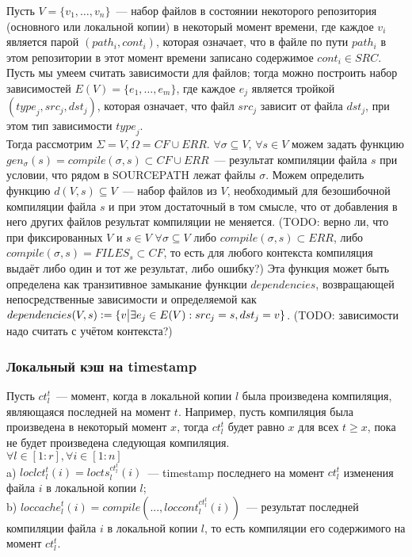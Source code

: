 Пусть $V = \{v_1, \dots, v_n\}$~--- набор файлов в состоянии некоторого репозитория (основного или локальной копии) в некоторый момент времени, где каждое $v_i$ является парой $(path_i, cont_i)$, которая означает, что в файле по пути $path_i$ в этом репозитории в этот момент времени записано содержимое $cont_i \in SRC$. Пусть мы умеем считать зависимости для файлов; тогда можно построить набор зависимостей $E(V) = \{e_1, \dots, e_m\}$, где каждое $e_j$ является тройкой $(\textit{type}_j, \textit{src}_j, \textit{dst}_j)$, которая означает, что файл $\textit{src}_j$ зависит от файла $\textit{dst}_j$, при этом тип зависимости $\textit{type}_j$.\\

Тогда рассмотрим $\Sigma = V, \Omega = CF \cup ERR$. $\forall \sigma \subseteq V$, $\forall s \in V$ можем задать функцию $gen_\sigma(s) = \textit{compile}(\sigma, s) \subset CF \cup ERR$~--- результат компиляции файла $s$ при условии, что рядом в SOURCEPATH лежат файлы $\sigma$. Можем определить функцию $d(V,s) \subseteq V$~--- набор файлов из $V$, необходимый для безошибочной компиляции файла $s$ и при этом достаточный в том смысле, что от добавления в него других файлов результат компиляции не меняется. (TODO: верно ли, что при фиксированных $V$ и $s \in V$ $\forall \sigma \subseteq V$ либо $\textit{compile}(\sigma, s) \subset ERR$, либо $\textit{compile}(\sigma, s) = FILES_s \subset CF$, то есть для любого контекста компиляция выдаёт либо один и тот же результат, либо ошибку?) Эта функция может быть определена как транзитивное замыкание функции $dependencies$, возвращающей непосредственные зависимости и определяемой как $dependencies(V,s) \vcentcolon= \{v \big| \exists e_j \in E(V): src_j = s, dst_j = v\}$. (TODO: зависимости надо считать с учётом контекста?)

\subsubsection{Локальный кэш на timestamp}

Пусть $ct_l^t$~--- момент, когда в локальной копии $l$ была произведена компиляция, являющаяся последней на момент $t$. Например, пусть компиляция была произведена в некоторый момент $x$, тогда $ct_l^t$ будет равно $x$ для всех $t \geqslant x$, пока не будет произведена следующая компиляция.\\
$\forall l \in [1:r], \forall i \in [1:n]$\\
\indent a) $loclct_l^t(i) = locts_l^{ct_l^t}(i)$~--- timestamp последнего на момент $ct_l^t$ изменения файла $i$ в локальной копии $l$;\\
\indent b) $loccache_l^t(i) = compile(..., loccont_l^{ct_l^t}(i))$~--- результат последней компиляции файла $i$ в локальной копии $l$, то есть компиляции его содержимого на момент $ct_l^t$.\\

